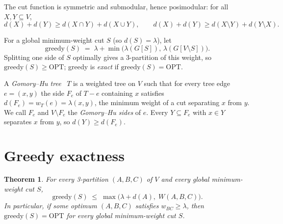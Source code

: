 \documentclass[preprint,12pt]{elsarticle}
\newtheorem{theorem}{Theorem}
\theoremstyle{definition}
\newcommand{\OPT}{\mathrm{OPT}}
\newcommand{\greedy}{\mathrm{greedy}}
\begin{document}
The cut function is symmetric and submodular, hence posimodular: for all $X,Y\subseteq V$,
\[
  d(X)+d(Y)\ge d(X\cap Y)+d(X\cup Y), \qquad d(X)+d(Y)\ge d(X\setminus Y)+d(Y\setminus X).
\]

For a global minimum-weight cut $S$ (so $d(S)=\lambda$), let
\[
  \greedy(S) \;=\; \lambda + \min\bigl(\lambda(G[S]),\,\lambda(G[V\setminus S])\bigr).
\]
Splitting one side of $S$ optimally gives a 3-partition of this weight, so $\greedy(S)\ge\OPT$; greedy
is \emph{exact} if $\greedy(S)=\OPT$.

A \emph{Gomory--Hu tree}~\cite{GomoryHu1961} $T$ is a weighted tree on $V$ such that for every tree
edge $e=(x,y)$ the side $F_e$ of $T-e$ containing $x$ satisfies $d(F_e)=w_T(e)=\lambda(x,y)$, the
minimum weight of a cut separating $x$ from $y$. We call $F_e$ and $V\setminus F_e$ the
\emph{Gomory--Hu sides} of $e$. Every $Y\subseteq F_e$ with $x\in Y$ separates $x$ from $y$, so
$d(Y)\ge d(F_e)$.

\section{Greedy exactness}

\begin{theorem}\label{thm:main}
For every 3-partition $(A,B,C)$ of $V$ and every global minimum-weight cut $S$,
\[
  \greedy(S)\;\le\;\max\bigl(\lambda+d(A),\;W(A,B,C)\bigr).
\]
In particular, if some optimum $(A,B,C)$ satisfies $w_{BC}\ge\lambda$, then $\greedy(S)=\OPT$ for
every global minimum-weight cut $S$.
\end{theorem}
\end{document}
